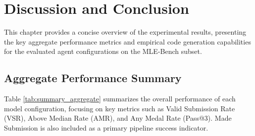 \chapter{Discussion and Conclusion}

This chapter provides a concise overview of the experimental results, presenting the key aggregate performance metrics and empirical code generation capabilities for the evaluated agent configurations on the MLE-Bench subset.

\section{Aggregate Performance Summary}

Table \ref{tab:summary_aggregate} summarizes the overall performance of each model configuration, focusing on key metrics such as Valid Submission Rate (VSR), Above Median Rate (AMR), and Any Medal Rate (Pass@3). Made Submission is also included as a primary pipeline success indicator.

